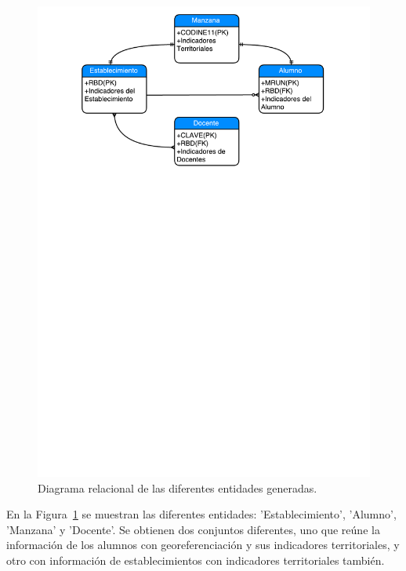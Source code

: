 \begin{figure}[H]
  \centering
    \includegraphics[trim=2cm 20cm 0cm 0cm,scale=0.9]{Figuras/6SolucionPropuesta/relacionDatos.pdf}
      \caption{Diagrama relacional de las diferentes entidades generadas.}
    \label{fig:rel}
\end{figure}

En la Figura~\ref{fig:rel} se muestran las diferentes entidades: 'Establecimiento', 'Alumno', 'Manzana' y 'Docente'. Se obtienen dos conjuntos diferentes, uno que reúne la información de los alumnos con georeferenciación y sus indicadores territoriales, y otro con información de establecimientos con indicadores territoriales también.

